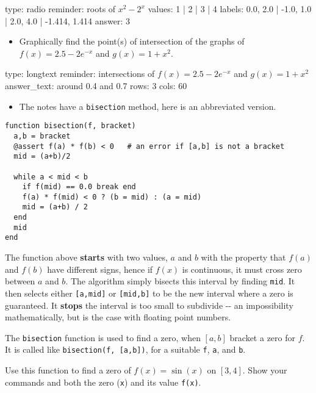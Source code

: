 \documentclass[12pt]{article}
\begin{document}
\begin{answer}
type: radio
reminder: roots of \( x^2 - 2^x \)
values: 1 | 2 | 3 | 4
labels: 0.0, 2.0 | -1.0, 1.0 | 2.0, 4.0 | -1.414, 1.414
answer: 3
\end{answer}

\begin{itemize}
\itemsep1pt\parskip0pt
\item
  Graphically find the point(s) of intersection of the graphs of
  $f(x) = 2.5-   2e^{-x}$ and $g(x) = 1 + x^2$.
\end{itemize}

\begin{answer}
type: longtext
reminder: intersections of \(f(x) = 2.5-2e^{-x}\) and \(g(x) = 1 + x^2\)
answer_text: around 0.4 and 0.7 
rows: 3
cols: 60
\end{answer}

\begin{itemize}
\itemsep1pt\parskip0pt
\item
  The notes have a \texttt{bisection} method, here is an abbreviated
  version.
\end{itemize}



\begin{verbatim}
function bisection(f, bracket)
  a,b = bracket  
  @assert f(a) * f(b) < 0   # an error if [a,b] is not a bracket
  mid = (a+b)/2

  while a < mid < b
    if f(mid) == 0.0 break end
    f(a) * f(mid) < 0 ? (b = mid) : (a = mid)  
    mid = (a+b) / 2
  end
  mid
end
\end{verbatim}
The function above \textbf{starts} with two values, $a$ and $b$ with the
property that $f(a)$ and $f(b)$ have different signs, hence if $f(x)$ is
continuous, it must cross zero between $a$ and $b$. The algorithm simply
bisects this interval by finding \texttt{mid}. It then selects either
\texttt{{[}a,mid{]}} or \texttt{{[}mid,b{]}} to be the new interval
where a zero is guaranteed. It \textbf{stops} the interval is too small
to subdivide -{}- an impossibility mathematically, but is the case with
floating point numbers.

The \texttt{bisection} function is used to find a zero, when $[a,b]$
bracket a zero for $f$. It is called like
\texttt{bisection(f, {[}a,b{]})}, for a suitable \texttt{f}, \texttt{a},
and \texttt{b}.

Use this function to find a zero of $f(x) = \sin(x)$ on $[3,4]$. Show
your commands and both the zero (\texttt{x}) and its value
\texttt{f(x)}.
\end{document}
